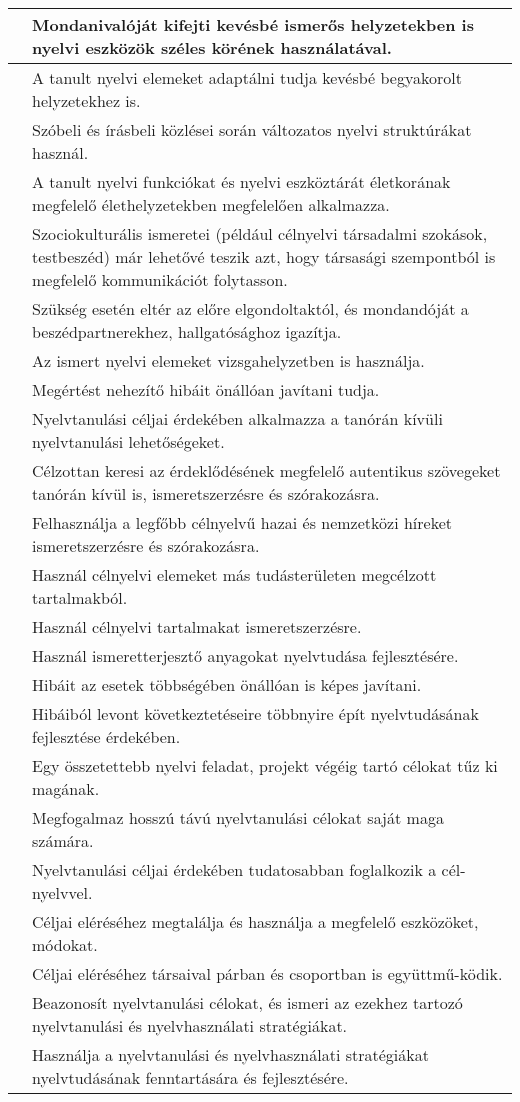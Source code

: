 \begin{longtable}[]{p{\evflength}@{\strut}>{\begin{minipage}{\columnlength}\strut}l<{\strut\end{minipage}}}
\tabularnewline
\hline
&
  Mondanivalóját kifejti kevésbé ismerős helyzetekben is nyelvi eszközök
  széles körének használatával.
\tabularnewline
\hline
&
  A tanult nyelvi elemeket adaptálni tudja kevésbé begyakorolt
  helyzetekhez is.
\tabularnewline
\hline
&
  Szóbeli és írásbeli közlései során változatos nyelvi struktúrákat
  használ.
\tabularnewline
\hline
&
  A tanult nyelvi funkciókat és nyelvi eszköztárát életkorának megfelelő
  élethelyzetekben megfelelően alkalmazza.
\tabularnewline
\hline
&
  Szociokulturális ismeretei (például célnyelvi társadalmi szokások,
  testbeszéd) már lehetővé teszik azt, hogy társasági szempontból is
  megfelelő kommunikációt folytasson.
\tabularnewline
\hline
&
  Szükség esetén eltér az előre elgondoltaktól, és mondandóját a
  beszédpartnerekhez, hallgatósághoz igazítja.
\tabularnewline
\hline
&
  Az ismert nyelvi elemeket vizsgahelyzetben is használja.
\tabularnewline
\hline
&
  Megértést nehezítő hibáit önállóan javítani tudja.
\tabularnewline
\hline
&
  Nyelvtanulási céljai érdekében alkalmazza a tanórán kívüli
  nyelvtanulási lehetőségeket.
\tabularnewline
\hline
&
  Célzottan keresi az érdeklődésének megfelelő autentikus szövegeket
  tanórán kívül is, ismeretszerzésre és szórakozásra.
\tabularnewline
\hline
&
  Felhasználja a legfőbb célnyelvű hazai és nemzetközi híreket
  ismeretszerzésre és szórakozásra.
\tabularnewline
\hline
&
  Használ célnyelvi elemeket más tudásterületen megcélzott tartalmakból.
\tabularnewline
\hline
&
  Használ célnyelvi tartalmakat ismeretszerzésre.
\tabularnewline
\hline
&
  Használ ismeretterjesztő anyagokat nyelvtudása fejlesztésére.
\tabularnewline
\hline
&
  Hibáit az esetek többségében önállóan is képes javítani.
\tabularnewline
\hline
&
  Hibáiból levont következtetéseire többnyire épít nyelvtudásának
  fejlesztése érdekében.
\tabularnewline
\hline
&
  Egy összetettebb nyelvi feladat, projekt végéig tartó célokat tűz ki
  magának.
\tabularnewline
\hline
&
  Megfogalmaz hosszú távú nyelvtanulási célokat saját maga számára.
\tabularnewline
\hline
&
  Nyelvtanulási céljai érdekében tudatosabban foglalkozik a cél-\break
  nyelvvel.
\tabularnewline
\hline
&
  Céljai eléréséhez megtalálja és használja a megfelelő eszközöket,
  módokat.
\tabularnewline
\hline
&
  Céljai eléréséhez társaival párban és csoportban is együttmű-\break ködik.
\tabularnewline
\hline
&
  Beazonosít nyelvtanulási célokat, és ismeri az ezekhez tartozó
  nyelvtanulási és nyelvhasználati stratégiákat.
\tabularnewline
\hline
&
  Használja a nyelvtanulási és nyelvhasználati stratégiákat nyelvtudásának
  fenntartására és fejlesztésére.

\end{longtable}
